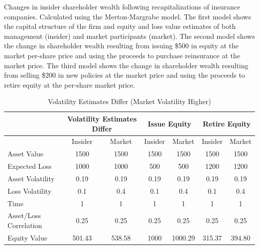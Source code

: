 \begin{table}\caption{Volatility Estimates Differ (Market Volatility Higher)\label{tab:volover}}
\begin{small}Changes in insider shareholder wealth following recapitalizations of insurance companies.  Calculated using the Merton-Margrabe model.  The first model shows the capital structure of the firm and equity and loss value estimates of both management (insider) and market participants (market).  The second model shows the change in shareholder wealth resulting from issuing \$500 in equity at the market per-share price and using the proceeds to purchase reinsurance at the market price.  The third model shows the change in shareholder wealth resulting from selling \$200 in new policies at the market price and using the proceeds to retire equity at the per-share market price.\end{small}
\begin{center}
\begin{tabular}{p{2in}cccccc}
\toprule
           & \multicolumn{ 2}{c}{Volatility Estimates Differ} & \multicolumn{ 2}{c}{Issue Equity} & \multicolumn{ 2}{c}{Retire Equity} \\ 
\midrule
\midrule
           &  Insider &     Market &  Insider &     Market &  Insider &     Market \\ 

Asset Value &       1500 &       1500 &       1500 &       1500 &       1500 &       1500 \\

Expected Loss &       1000 &       1000 &        500 &        500 &       1200 &       1200 \\ 

Asset Volatility &       0.19 &       0.19 &       0.19 &       0.19 &       0.19 &       0.19 \\ 

Loss Volatility &        0.1 &        0.4 &        0.1 &        0.4 &        0.1 &        0.4 \\ 

      Time &          1 &          1 &          1 &          1 &          1 &          1 \\ 

Asset/Loss Correlation &       0.25 &       0.25 &       0.25 &       0.25 &       0.25 &       0.25 \\ 

\midrule
           
Equity Value & 501.43 &   538.58 &       1000 &   1000.29 &   315.37 &    394.80 \\ 


\end{tabular}
\end{center}
\end{table}
